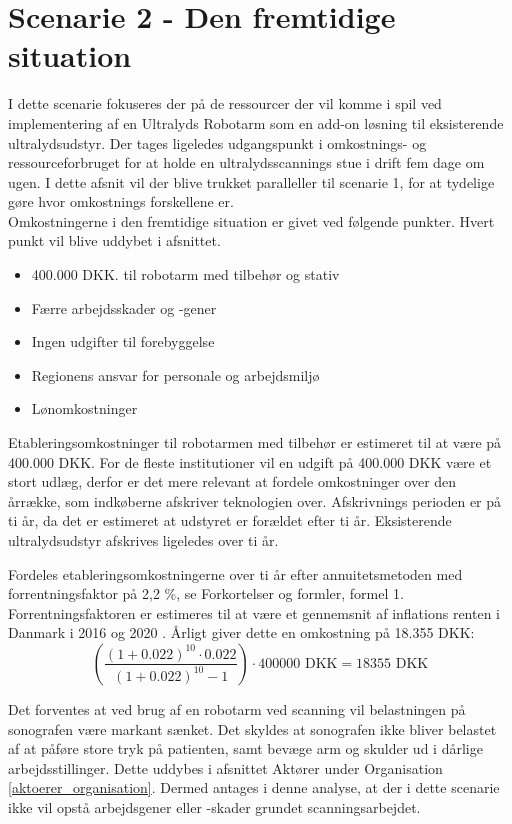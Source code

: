 \section{Scenarie 2 - Den fremtidige situation}
I dette scenarie fokuseres der på de ressourcer der vil komme i spil ved implementering af en Ultralyds Robotarm som en add-on løsning til eksisterende ultralydsudstyr. Der tages ligeledes udgangspunkt i omkostnings- og ressourceforbruget for at holde en ultralydsscannings stue i drift fem dage om ugen. I dette afsnit vil der blive trukket paralleller til scenarie 1, for at tydelige gøre hvor omkostnings forskellene er. \\
Omkostningerne i den fremtidige situation er givet ved følgende punkter. Hvert punkt vil blive uddybet i afsnittet.
\begin{itemize}
\item 400.000 DKK. til robotarm med tilbehør og stativ
\item Færre arbejdsskader og -gener
\item Ingen udgifter til forebyggelse
\item Regionens ansvar for personale og arbejdsmiljø
\item Lønomkostninger
\end{itemize}
Etableringsomkostninger til robotarmen med tilbehør er estimeret til at være på 400.000 DKK. For de fleste institutioner vil en udgift på 400.000 DKK være et stort udlæg, derfor er det mere relevant at fordele omkostninger over den årrække, som indkøberne afskriver teknologien over. Afskrivnings perioden er på ti år, da det er estimeret at udstyret er forældet efter ti år. Eksisterende ultralydsudstyr afskrives ligeledes over ti år. 

Fordeles etableringsomkostningerne over ti år efter annuitetsmetoden med forrentningsfaktor på 2,2 \%, se Forkortelser og formler, formel 1. Forrentningsfaktoren er estimeres til at være et gennemsnit af inflations renten i Danmark i 2016 og 2020 \cite{inflation}. Årligt giver dette en omkostning på 18.355 DKK:
\begin{equation}
\left(\frac{(1+0.022)^{10}\cdot0.022}{(1+0.022)^{10}-1}\right)\cdot400000 \text{ DKK}=18355 \text{ DKK}
\end{equation}

Det forventes at ved brug af en robotarm ved scanning vil belastningen på sonografen være markant sænket. Det skyldes at sonografen ikke bliver belastet af at påføre store tryk på patienten, samt bevæge arm og skulder ud i dårlige arbejdsstillinger. Dette uddybes i afsnittet Aktører under Organisation \ref{aktoerer_organisation}. Dermed antages i denne analyse, at der i dette scenarie ikke vil opstå arbejdsgener eller -skader grundet scanningsarbejdet. 

